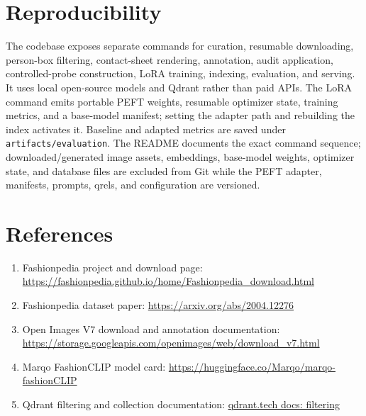 \documentclass[11pt]{article}
\begin{document}
\section{Reproducibility}

The codebase exposes separate commands for curation, resumable downloading, person-box filtering, contact-sheet rendering, annotation, audit application, controlled-probe construction, LoRA training, indexing, evaluation, and serving. It uses local open-source models and Qdrant rather than paid APIs. The LoRA command emits portable PEFT weights, resumable optimizer state, training metrics, and a base-model manifest; setting the adapter path and rebuilding the index activates it. Baseline and adapted metrics are saved under \texttt{artifacts/evaluation}. The README documents the exact command sequence; downloaded/generated image assets, embeddings, base-model weights, optimizer state, and database files are excluded from Git while the PEFT adapter, manifests, prompts, qrels, and configuration are versioned.

\section{References}
{\small
\begin{enumerate}[leftmargin=1.4em,itemsep=0.15em,topsep=0.2em,parsep=0pt]
  \item Fashionpedia project and download page: \url{https://fashionpedia.github.io/home/Fashionpedia_download.html}
  \item Fashionpedia dataset paper: \url{https://arxiv.org/abs/2004.12276}
  \item Open Images V7 download and annotation documentation: \url{https://storage.googleapis.com/openimages/web/download_v7.html}
  \item Marqo FashionCLIP model card: \url{https://huggingface.co/Marqo/marqo-fashionCLIP}
  \item Qdrant filtering and collection documentation: \href{https://qdrant.tech/documentation/search/filtering/}{qdrant.tech docs: filtering}
\end{enumerate}
}
\end{document}
